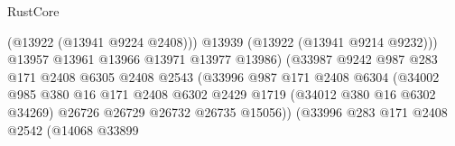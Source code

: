 \begin{lexlean}{RustCore}
\begin{coremodule}
                                                    (@13922 (@13941 @9224 @2408)))
                                                  @13939
                                                  (@13922 (@13941 @9214 @9232)))
                                                @13957
                                                @13961
                                                @13966
                                                @13971
                                                @13977
                                                @13986)
                                              (@33987
                                                @9242
                                                @987
                                                @283
                                                @171
                                                @2408
                                                @6305
                                                @2408
                                                @2543
                                                (@33996
                                                  @987
                                                  @171
                                                  @2408
                                                  @6304
                                                  (@34002
                                                    @985
                                                    @380
                                                    @16
                                                    @171
                                                    @2408
                                                    @6302
                                                    @2429
                                                    @1719
                                                    (@34012 @380 @16 @6302 @34269)
                                                    @26726
                                                    @26729
                                                    @26732
                                                    @26735
                                                    @15056))
                                                (@33996
                                                  @283
                                                  @171
                                                  @2408
                                                  @2542
                                                  (@14068
                                                    @33899

\end{coremodule}
\end{lexlean}
